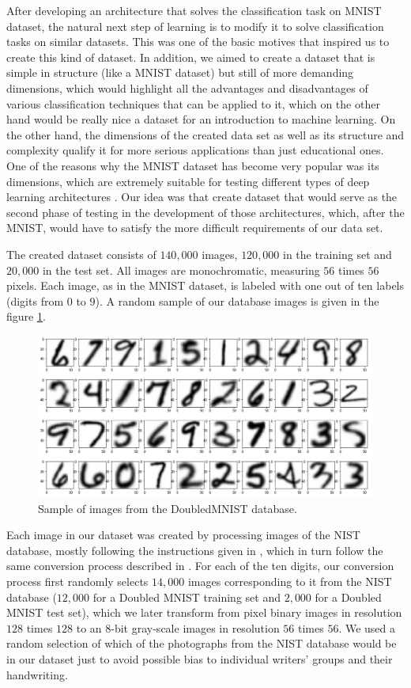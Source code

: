 \documentclass[eng]{simposium}
\begin{document}
After developing an architecture that solves the classification task on MNIST dataset, the natural next step of learning is 
to modify it to solve classification tasks on similar datasets. 
This was one of the basic motives that inspired us to create this kind of dataset. 
In addition, we aimed to create a dataset that is simple in structure (like a MNIST dataset) but still of more demanding 
dimensions, which would highlight all the advantages and disadvantages of various classification techniques that can be 
applied to it, which on the other hand would be really nice a dataset for an introduction to machine learning. 
On the other hand, the dimensions of the created data set as well as its structure and complexity qualify it for more 
serious applications than just educational ones. 
One of the reasons why the MNIST dataset has become very popular was its dimensions, which are extremely suitable for 
testing different types of deep learning architectures \cite{27}. 
Our idea was that create dataset that would serve as the second phase of testing in the development of those architectures, 
which, after the MNIST, would have to satisfy the more difficult requirements of our data set. 

The created dataset consists of $140,000$ images, $120,000$ in the training set and $20,000$ in the test set. 
All images are monochromatic, measuring $56$ times $56$ pixels. 
Each image, as in the MNIST dataset, is labeled with one out of ten labels (digits from $0$ to $9$). 
A random sample of our database images is given in the figure \ref{fig:nist_sample}. 

\begin{figure}[!ht]
  \centering
  \includegraphics[width=1\textwidth]{sample_from_nist.png}
  \caption{Sample of images from the DoubledMNIST database.}
  \label{fig:nist_sample}
\end{figure}

Each image in our dataset was created by processing images of the NIST database, 
mostly following the instructions given in \cite{1}, which in turn follow the same conversion process described in \cite{8}. 
For each of the ten digits, our conversion process first randomly selects $14,000$ images corresponding to it from the NIST 
database ($12,000$ for a Doubled MNIST training set and $2,000$ for a Doubled MNIST test set), which we later transform 
from pixel binary images in resolution $128$ times $128$ to an 8-bit gray-scale images in resolution $56$ times $56$. 
We used a random selection of which of the photographs from the NIST database would be in our dataset just to avoid possible 
bias to individual writers' groups and their handwriting. 
\end{document}
